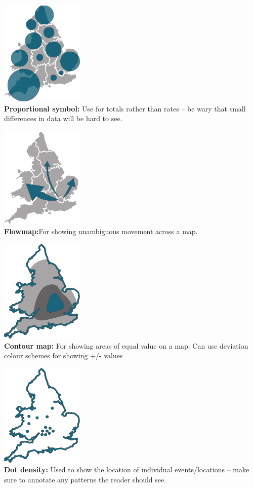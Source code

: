 \documentclass[
  a4paper,
  onecolumn,
  oneside]{book}
\begin{document}
\includegraphics{part1/images/spatial2.png}\\
\textbf{Proportional symbol:} Use for totals rather than rates -- be
wary that small differences in data will be hard to see.

\includegraphics{part1/images/spatial3.png}\\
\textbf{Flowmap:}For showing unambiguous movement across a map.

\includegraphics{part1/images/spatial4.png}\\
\textbf{Contour map:} For showing areas of equal value on a map. Can use
deviation colour schemes for showing +/- values

\includegraphics{part1/images/spatial5.png}\\
\textbf{Dot density:} Used to show the location of individual
events/locations -- make sure to annotate any patterns the reader should
see.
\end{document}
